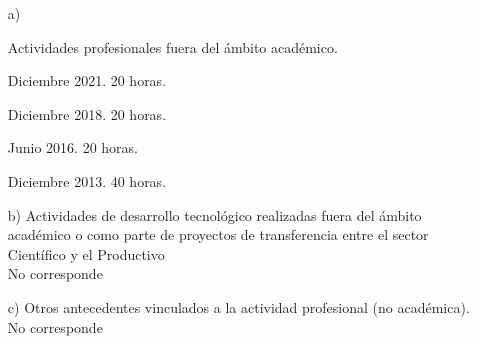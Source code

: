 \begin{enumerate}[leftmargin=0.8cm]

  \item[a)]{Actividades profesionales fuera del ámbito académico.

    \begin{itemize}[leftmargin=0.2cm]

      {}
      {Diciembre 2021. 20 horas.}
      {}

      {}
      {Diciembre 2018. 20 horas.}
      {}

      {}
      {Junio 2016. 20 horas.}
      {}

      {}
      {Diciembre 2013. 40 horas.}
      {}

    \end{itemize}

  }

  \item[b)]{Actividades de desarrollo tecnológico realizadas fuera del ámbito académico o como parte de proyectos de
transferencia entre el sector Científico y el Productivo
    \\ No corresponde
  }

  \item[c)]{Otros antecedentes vinculados a la actividad profesional (no académica).
    \\ No corresponde
  }

\end{enumerate}
